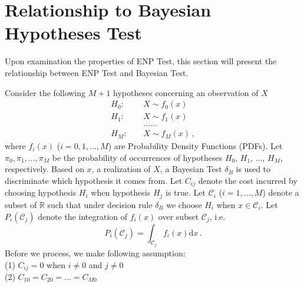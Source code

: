 \section{Relationship to Bayesian Hypotheses Test}
Upon examination the properties of ENP Test, this section will present the relationship between ENP Test and Bayesian Test. 

Consider the following $M+1$ hypotheses concerning an observation of $X$
\begin{equation}
\label{equ: 2 pdf}
\begin{split}
H_0:\;\;\;\;&X \sim f_0(x)\\
H_1:\;\;\;\;&X \sim f_1(x)\\
&......\\
H_{M}:\;\;\;\;&X \sim f_M(x)\,,
\end{split}
\end{equation}
where $f_i(x)$ ($i=0, 1, ..., M$) are Probability Density Functions (PDFs). 
Let $\pi_0, \pi_1, ..., \pi_M$ be the probability of occurrences of hypotheses $H_0$, $H_1$, ..., $H_M$, respectively. 
Based on $x$, a realization of $X$, a Bayesian Test $\delta_B$ is used to discriminate which hypothesis it comes from.  
Let $C_{ij}$ denote the cost incurred by choosing hypothesis $H_i$ when hypothesis $H_j$ is true. 
Let $\mathcal{C}_i$ ($i=1, ..., M$) denote a subset of $\mathbb{R}$ such that under decision rule $\delta_B$ we choose $H_i$ when $x \in \mathcal{C}_i$. 
Let $P_i(\mathcal{C}_j)$ denote the integration of $f_i(x)$ over subset $\mathcal{C}_j$, i.e. 
\[
P_i(\mathcal{C}_j) = \int_{\mathcal{C}_j} f_i(x)\mathrm{d}x\,.
\]
Before we process, we make following assumption:
\\(1) $C_{ij} = 0$ when $i \neq 0$ and $j \neq 0$
\\(2) $C_{10} = C_{20} = ... = C_{M0}$

